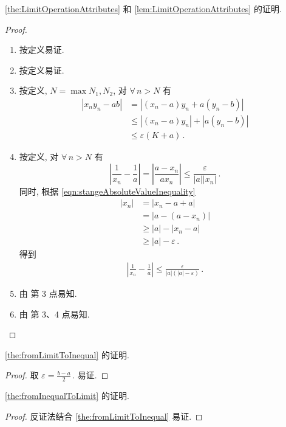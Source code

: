 \documentclass{book}
\newcommand{\Any}{\forall\,}
\newcommand{\abs}[1]{\left\lvert #1 \right\rvert}
\renewcommand{\ge}{\geqslant}
\renewcommand{\le}{\leqslant}
\numberwithin{equation}{section}
\numberwithin{figure}{section}
\theoremstyle{definition}
\begin{document}
\cref{the:LimitOperationAttributes} 和 \cref{lem:LimitOperationAttributes} 的证明.
\begin{proof}
  \leavevmode

  \begin{enumerate}
    \item 按定义易证.
    \item 按定义易证.
    \item 按定义, $N=\max{N_1,N_2}$, 对 $\Any n>N$ 有
      \begin{align*}
	\abs{x_n y_n-ab}&=\abs{(x_n-a)y_n+a(y_n-b)}\\
	&\le\abs{(x_n-a)y_n}+\abs{a(y_n-b)}\\
	&\le\varepsilon (K+a)\,.
      \end{align*}
    \item 按定义, 对 $\Any n>N$ 有
      \begin{equation*}
	\abs{\frac{1}{x_n}-\frac{1}{a}}=\abs{\frac{a-x_n}{ax_n}}\le\frac{\varepsilon}{\abs{a}\abs{x_n}}\,.
      \end{equation*}
      同时, 根据 \cref{eqn:stangeAbsoluteValueInequality} 
      \begin{align*}
	\abs{x_n}&=\abs{x_n-a+a}\\
	&=\abs{a-(a-x_n)}\\
	&\ge\abs{a}-\abs{x_n-a}\\
	&\ge\abs{a}-\varepsilon\,.
      \end{align*}
      得到
      \begin{align*}
	\abs{\frac{1}{x_n}-\frac{1}{a}}\le\frac{\varepsilon}{\abs{a}(\abs{a}-\varepsilon)}\,.
      \end{align*}
    \item 由 第 3 点易知.
    \item 由 第 3、4 点易知.
  \end{enumerate}
\end{proof}

\cref{the:fromLimitToInequal} 的证明.
\begin{proof}
  取 $\varepsilon=\frac{b-a}{2}$\,.
  易证.
\end{proof}

\cref{the:fromInequalToLimit} 的证明.
\begin{proof}
  反证法结合 \cref{the:fromLimitToInequal} 易证. 
\end{proof}
\end{document}
